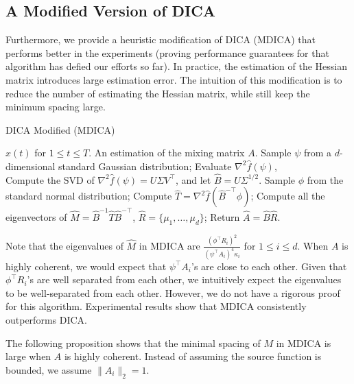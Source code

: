 \documentclass[11pt]{article}
\begin{document}
\subsection{A Modified Version of DICA}
\label{subsec:modifiedDICA}
Furthermore, we provide a heuristic modification of DICA (MDICA) that performs better in the experiments (proving performance guarantees for that algorithm has defied our efforts so far). 
In practice, the estimation of the Hessian matrix introduces large estimation error.
The intuition of this modification is to reduce the number of estimating the Hessian matrix, while still keep the minimum spacing large.
\begin{algorithm} 
	\caption{DICA Modified (MDICA)}
	\label{alg:DICA_Mod}
	\begin{algorithmic}[1]
		\INPUT $x(t)$ for $1\le t \le T$. 
		\OUTPUT An estimation of the mixing matrix $A$. 
		\STATE Sample $\psi$ from a $d$-dimensional standard Gaussian distribution;
		\STATE Evaluate $\nabla^2\hat{f}(\psi)$, \\
		\STATE Compute the SVD of $\nabla^2\hat{f}(\psi) = U \Sigma V^{\top}$, and let $\hat{B} =  U \Sigma^{1/2}$.
		\STATE Sample $\phi$ from the standard normal distribution;
		\STATE Compute $\hat{T} = \nabla^2 \hat{f}(\hat{B}^{-\top}\phi)$;
		\STATE Compute all the eigenvectors of $\hat{M} = \hat{B}^{-1}\hat{T}\hat{B}^{-\top}$, $\hat{R} = \{\mu_1,\ldots,\mu_d\}$;
		\STATE Return $\hat{A} = \hat{B}\hat{R}$.
	\end{algorithmic}
\end{algorithm}
\begin{remark}
	\label{rmk:DICA_Mod}
	Note that the eigenvalues of $\hat{M}$ in MDICA are $\frac{(\phi^{\top}R_i)^2}{(\psi^{\top}A_i)^4\kappa_i}$ for $1\le i\le d$. 
	When $A$ is highly coherent, we would expect that $\psi^{\top}A_i$'s are close to each other. 
	Given that $\phi^{\top}R_i$'s are well separated from each other, we intuitively expect the eigenvalues to be well-separated from each other. 
	However, we do not have a rigorous proof for this algorithm.
	Experimental results show that MDICA consistently outperforms DICA. 
\end{remark}
The following proposition shows that the minimal spacing of $M$ in MDICA is large when $A$ is highly coherent. Instead of assuming the source function is bounded, we assume $\|A_i\|_2 = 1$.
\end{document}
